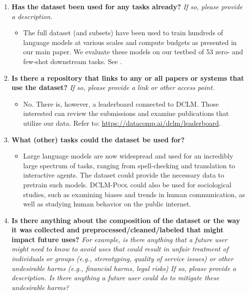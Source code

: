 \documentclass{article}
\newcommand{\dclm}{\textsc{DCLM}\xspace}
\newcommand{\rawpool}{\textsc{DCLM-Pool}\xspace}
\newcommand{\leaderboard}{\url{https://datacomp.ai/dclm/leaderboard}\xspace}
\begin{document}
\begin{enumerate}[label=Q\arabic*, resume]

\item \textbf{Has the dataset been used for any tasks already?} \textit{If so, please provide a description.}

\begin{itemize}
\item The full dataset (and subsets) have been used to train hundreds of language models at various scales and compute budgets as presented in our main paper. We evaluate these models on our testbed of 53 zero- and few-shot downstream tasks. See .
\end{itemize}

\item \textbf{Is there a repository that links to any or all papers or systems that use the dataset?} \textit{If so, please provide a link or other access point.}

\begin{itemize}
\item No. There is, however, a leaderboard connected to \dclm. Those interested can review the submissions and examine publications that utilize our data. Refer to: \leaderboard.
\end{itemize}

\item \textbf{What (other) tasks could the dataset be used for?}

\begin{itemize}
\item Large language models are now widespread and used for an incredibly large spectrum of tasks, ranging from spell-checking and translation to interactive agents. The dataset could provide the necessary data to pretrain such models. \rawpool could also be used for sociological studies, such as examining biases and trends in human communication, as well as studying human behavior on the public internet.
\end{itemize}

\item \textbf{Is there anything about the composition of the dataset or the way it was collected and preprocessed/cleaned/labeled that might impact future uses?} \textit{For example, is there anything that a future user might need to know to avoid uses that could result in unfair treatment of individuals or groups (e.g., stereotyping, quality of service issues) or other undesirable harms (e.g., financial harms, legal risks) If so, please provide a description. Is there anything a future user could do to mitigate these undesirable harms?}


\end{enumerate}
\end{document}

